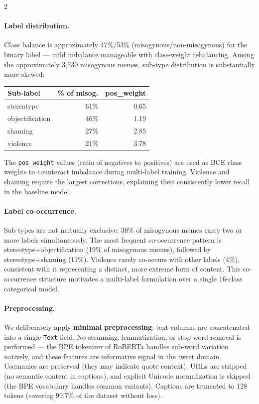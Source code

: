\documentclass[11pt]{article}
\begin{document}
\begin{multicols}{2}
\paragraph{Label distribution.}
Class balance is approximately 47\%/53\% (misogynous/non-misogynous) for the binary label — mild imbalance manageable with class-weight rebalancing. Among the approximately 3{,}530 misogynous memes, sub-type distribution is substantially more skewed:

\begin{center}
\small
\begin{tabular}{lrr}
\toprule
\textbf{Sub-label} & \textbf{\% of misog.} & \textbf{pos\_weight} \\
\midrule
stereotype      & 61\% & 0.65 \\
objectification & 46\% & 1.19 \\
shaming         & 27\% & 2.85 \\
violence        & 21\% & 3.78 \\
\bottomrule
\end{tabular}
\end{center}

The \texttt{pos\_weight} values (ratio of negatives to positives) are used as BCE class weights to counteract imbalance during multi-label training. Violence and shaming require the largest corrections, explaining their consistently lower recall in the baseline model.

\paragraph{Label co-occurrence.}
Sub-types are not mutually exclusive: 38\% of misogynous memes carry two or more labels simultaneously. The most frequent co-occurrence pattern is stereotype+objectification (19\% of misogynous memes), followed by stereotype+shaming (11\%). Violence rarely co-occurs with other labels (4\%), consistent with it representing a distinct, more extreme form of content. This co-occurrence structure motivates a multi-label formulation over a single 16-class categorical model.

\paragraph{Preprocessing.}
We deliberately apply \textbf{minimal preprocessing}: text columns are concatenated into a single \texttt{Text} field. No stemming, lemmatization, or stop-word removal is performed — the BPE tokenizer of RoBERTa handles sub-word variation natively, and these features are informative signal in the tweet domain. Usernames are preserved (they may indicate quote context), URLs are stripped (no semantic content in captions), and explicit Unicode normalization is skipped (the BPE vocabulary handles common variants). Captions are truncated to 128 tokens (covering 99.7\% of the dataset without loss).


\end{multicols}
\end{document}
